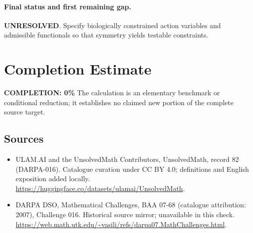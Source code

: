\documentclass[11pt]{article}
\begin{document}
\paragraph{Final status and first remaining gap.}
\textbf{UNRESOLVED}. Specify biologically constrained action variables and admissible functionals so that symmetry yields testable constraints.

\section{Completion Estimate}
\noindent\textbf{COMPLETION: 0\%}
The calculation is an elementary benchmark or conditional reduction; it establishes no claimed new portion of the complete source target.

\subsection{Sources}
\begin{itemize}
\item[\hypertarget{source:82:1}{S1}] ULAM.AI and the UnsolvedMath Contributors, UnsolvedMath, record 82 (DARPA-016). Catalogue curation under CC BY 4.0; definitions and English exposition added locally.
\url{https://huggingface.co/datasets/ulamai/UnsolvedMath}.
\item[\hypertarget{source:82:2}{S2}] DARPA DSO, Mathematical Challenges, BAA 07-68 (catalogue attribution: 2007), Challenge 016. Historical source mirror; unavailable in this check.
\url{https://web.math.utk.edu/~vasili/refs/darpa07.MathChallenges.html}.
\end{itemize}
\label{end:82}
\end{document}

